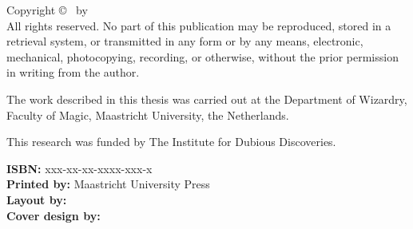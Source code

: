 \thispagestyle{empty}
\vspace*{\fill}

\noindent
\vspace{0.8\baselineskip} %

\noindent
Copyright © \thesisyear\ by \thesisauthor\\[0.5\baselineskip]
All rights reserved. No part of this publication may be reproduced, stored in a retrieval system, or transmitted in any form or by any means, electronic, mechanical, photocopying, recording, or otherwise, without the prior permission in writing from the author.

\bigskip

\noindent
The work described in this thesis was carried out at the Department of Wizardry, Faculty of Magic, Maastricht University, the Netherlands.

\bigskip

\noindent
This research was funded by The Institute for Dubious Discoveries.

\bigskip
\noindent
\textbf{ISBN:} xxx-xx-xx-xxxx-xxx-x\\
\textbf{Printed by:} Maastricht University Press\\
\textbf{Layout by:} \thesisauthor\\
\textbf{Cover design by:} \thesisauthor\\

\vspace*{\fill}
\clearpage

